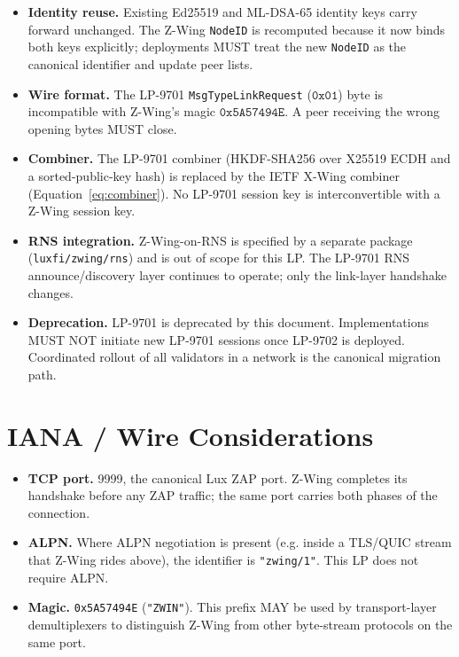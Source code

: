 \documentclass[11pt,a4paper]{article}
\begin{document}
\begin{itemize}[leftmargin=*]
  \item \textbf{Identity reuse.} Existing Ed25519 and ML-DSA-65
        identity keys carry forward unchanged. The Z-Wing
        \texttt{NodeID} is recomputed because it now binds both keys
        explicitly; deployments MUST treat the new \texttt{NodeID} as
        the canonical identifier and update peer lists.
  \item \textbf{Wire format.} The LP-9701 \texttt{MsgTypeLinkRequest}
        ($\texttt{0x01}$) byte is incompatible with Z-Wing's magic
        $\texttt{0x5A57494E}$. A peer receiving the wrong opening
        bytes MUST close.
  \item \textbf{Combiner.} The LP-9701 combiner
        (HKDF-SHA256 over X25519 ECDH and a sorted-public-key hash)
        is replaced by the IETF X-Wing combiner (Equation~\ref{eq:combiner}).
        No LP-9701 session key is interconvertible with a Z-Wing
        session key.
  \item \textbf{RNS integration.} Z-Wing-on-RNS is specified by a
        separate package (\texttt{luxfi/zwing/rns}) and is out of
        scope for this LP. The LP-9701 RNS announce/discovery layer
        continues to operate; only the link-layer handshake changes.
  \item \textbf{Deprecation.} LP-9701 is deprecated by this document.
        Implementations MUST NOT initiate new LP-9701 sessions once
        LP-9702 is deployed. Coordinated rollout of all validators in
        a network is the canonical migration path.
\end{itemize}

\section{IANA / Wire Considerations}

\begin{itemize}[leftmargin=*]
  \item \textbf{TCP port.} 9999, the canonical Lux ZAP port. Z-Wing
        completes its handshake before any ZAP traffic; the same port
        carries both phases of the connection.
  \item \textbf{ALPN.} Where ALPN negotiation is present (e.g. inside
        a TLS/QUIC stream that Z-Wing rides above), the identifier is
        \texttt{"zwing/1"}. This LP does not require ALPN.
  \item \textbf{Magic.} \texttt{0x5A57494E} (\texttt{"ZWIN"}). This
        prefix MAY be used by transport-layer demultiplexers to
        distinguish Z-Wing from other byte-stream protocols on the
        same port.
\end{itemize}
\end{document}
